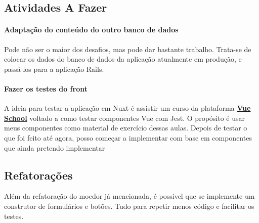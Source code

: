 \subsection{Atividades A Fazer}\label{subsec:to-do}

\paragraph{Adaptação do conteúdo do outro banco de dados} Pode não ser o maior dos desafios, mas pode dar bastante
trabalho. Trata-se de colocar os dados do banco de dados da aplicação atualmente em produção, e passá-los para a
aplicação Rails.

\paragraph{Fazer os testes do front} A ideia para testar a aplicação em Nuxt é assistir um curso da plataforma
\href{https://vueschool.io/}{\textbf{Vue School}} voltado a como testar componentes Vue com Jest. O propósito é usar meus
componentes como material de exercício dessas aulas. Depois de testar o que foi feito até agora, posso começar a
implementar com base em componentes que ainda pretendo implementar

\subsection{Refatorações}\label{subsec:refatoracoes}

Além da refatoração do moedor já mencionada, é possível que se implemente um construtor de formulários e botões. Tudo
para repetir menos código e facilitar os testes.
